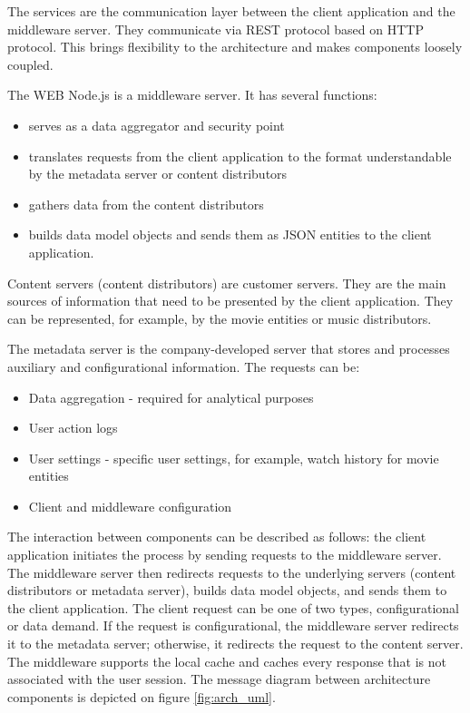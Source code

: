 The services are the communication layer between the client application and the middleware server. They communicate via REST protocol based on HTTP protocol. This brings flexibility to the architecture and makes components loosely coupled.

The WEB Node.js is a middleware server. It has several functions:

\begin{itemize}
	\item serves as a data aggregator and security point
	\item translates requests from the client application to the format understandable by the metadata server or content distributors
	\item gathers data from the content distributors
	\item builds data model objects and sends them as JSON entities to the client application.
\end{itemize}

Content servers (content distributors) are customer servers. They are the main sources of information that need to be presented by the client application. They can be represented, for example, by the movie entities or music distributors.

The metadata server is the company-developed server that stores and processes auxiliary and configurational information. The requests can be: 

\begin{itemize}
	\item Data aggregation - required for analytical purposes
	\item User action logs 
	\item User settings - specific user settings, for example, watch history for movie entities
	\item Client and middleware configuration
\end{itemize} 

The interaction between components can be described as follows: the client application initiates the process by sending requests to the middleware server. The middleware server then redirects requests to the underlying servers (content distributors or metadata server), builds data model objects, and sends them to the client application. The client request can be one of two types, configurational or data demand. If the request is configurational, the middleware server redirects it to the metadata server; otherwise, it redirects the request to the content server. The middleware supports the local cache and caches every response that is not associated with the user session. The message diagram between architecture components is depicted on figure \ref{fig:arch_uml}.


